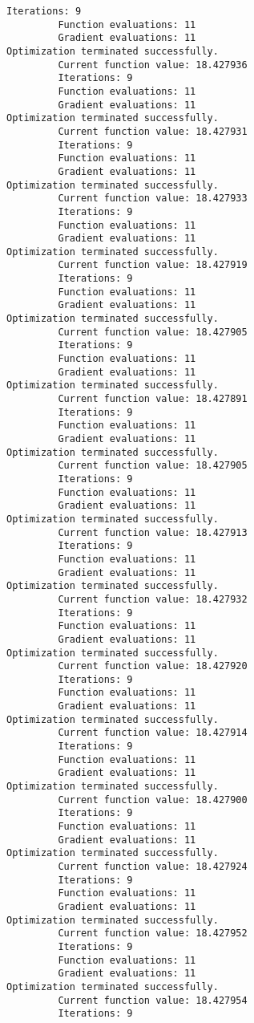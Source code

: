 \documentclass[11pt]{article}
\begin{document}
\begin{Verbatim}[commandchars=\\\{\}]
         Iterations: 9
         Function evaluations: 11
         Gradient evaluations: 11
Optimization terminated successfully.
         Current function value: 18.427936
         Iterations: 9
         Function evaluations: 11
         Gradient evaluations: 11
Optimization terminated successfully.
         Current function value: 18.427931
         Iterations: 9
         Function evaluations: 11
         Gradient evaluations: 11
Optimization terminated successfully.
         Current function value: 18.427933
         Iterations: 9
         Function evaluations: 11
         Gradient evaluations: 11
Optimization terminated successfully.
         Current function value: 18.427919
         Iterations: 9
         Function evaluations: 11
         Gradient evaluations: 11
Optimization terminated successfully.
         Current function value: 18.427905
         Iterations: 9
         Function evaluations: 11
         Gradient evaluations: 11
Optimization terminated successfully.
         Current function value: 18.427891
         Iterations: 9
         Function evaluations: 11
         Gradient evaluations: 11
Optimization terminated successfully.
         Current function value: 18.427905
         Iterations: 9
         Function evaluations: 11
         Gradient evaluations: 11
Optimization terminated successfully.
         Current function value: 18.427913
         Iterations: 9
         Function evaluations: 11
         Gradient evaluations: 11
Optimization terminated successfully.
         Current function value: 18.427932
         Iterations: 9
         Function evaluations: 11
         Gradient evaluations: 11
Optimization terminated successfully.
         Current function value: 18.427920
         Iterations: 9
         Function evaluations: 11
         Gradient evaluations: 11
Optimization terminated successfully.
         Current function value: 18.427914
         Iterations: 9
         Function evaluations: 11
         Gradient evaluations: 11
Optimization terminated successfully.
         Current function value: 18.427900
         Iterations: 9
         Function evaluations: 11
         Gradient evaluations: 11
Optimization terminated successfully.
         Current function value: 18.427924
         Iterations: 9
         Function evaluations: 11
         Gradient evaluations: 11
Optimization terminated successfully.
         Current function value: 18.427952
         Iterations: 9
         Function evaluations: 11
         Gradient evaluations: 11
Optimization terminated successfully.
         Current function value: 18.427954
         Iterations: 9

\end{Verbatim}
\end{document}
